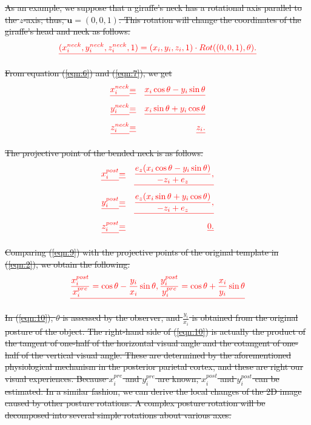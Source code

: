 \documentclass[journal]{IEEEtran}
\providecommand{\DIFdel}[1]{{\protect\color{red}\sout{#1}}}                      %
\begin{document}
\DIFdel{As an example, we suppose that a giraffe's neck has a rotational axis parallel to the $z$-axis; 
thus, $\mathbf{u} = (0,0,1)$. 
This rotation will change the coordinates of the giraffe's head and neck as follows.
}\begin{displaymath}\DIFdel{
(x_i^{neck},y_i^{neck},z_i^{neck},1)=(x_i,y_i,z_i,1)\cdot Rot((0,0,1),\theta).
\label{eqn:7}
}\end{displaymath}

\DIFdel{From equation (\ref{eqn:6}) and (\ref{eqn:7}), we get
}\begin{align*}\DIFdel{
x_i^{neck}}&\DIFdel{=}&\DIFdel{x_i\cos\theta-y_i\sin\theta\nonumber}\\
\DIFdel{y_i^{neck}}&\DIFdel{=}&\DIFdel{x_i\sin\theta+y_i\cos\theta\nonumber}\\
\DIFdel{z_i^{neck}}&\DIFdel{=}&\DIFdel{z_i.
}\end{align*}

\DIFdel{The projective point of the bended neck is as follows.
}\begin{align*}\DIFdel{
x_i^{post}}&\DIFdel{=}&\DIFdel{\frac{e_z(x_i\cos\theta-y_i\sin\theta)}{-z_i+e_z}, \nonumber}\\
\DIFdel{y_i^{post}}&\DIFdel{=}&\DIFdel{\frac{e_z(x_i\sin\theta+y_i\cos\theta)}{-z_i+e_z}, \nonumber}\\
\DIFdel{z_i^{post}}&\DIFdel{=}&\DIFdel{0.
\label{eqn:9}
}\end{align*}

\DIFdel{Comparing (\ref{eqn:9}) with the projective points of the original template in (\ref{eqn:2}),
we obtain the following.
}\begin{displaymath}\DIFdel{
\frac{x_i^{post}}{x_i^{pre}}=\cos\theta-\frac{y_i}{x_i}\sin\theta,
\frac{y_i^{post}}{y_i^{pre}}=\cos\theta+\frac{x_i}{y_i}\sin\theta
\label{eqn:10}
}\end{displaymath}

\DIFdel{In (\ref{eqn:10}), $\theta$ is assessed by the observer, 
and $\frac{y_i}{x_i}$ is obtained from the original posture of the object. 
The right-hand side of (\ref{eqn:10}) is actually the product of the tangent of one-half of the horizontal visual angle and the cotangent of one-half of the vertical visual angle. 
These are determined by the aforementioned physiological mechanism in the posterior parietal cortex, 
and these are right our visual experiences. 
Because $x_i^{pre}$ and $y_i^{pre}$ are known, $x_i^{post}$ and $y_i^{post}$ can be estimated. 
In a similar fashion, we can derive the local changes of the 2D image caused by other posture rotations. 
A complex posture rotation will be decomposed into several simple rotations about various axes.
}%
\end{document}
